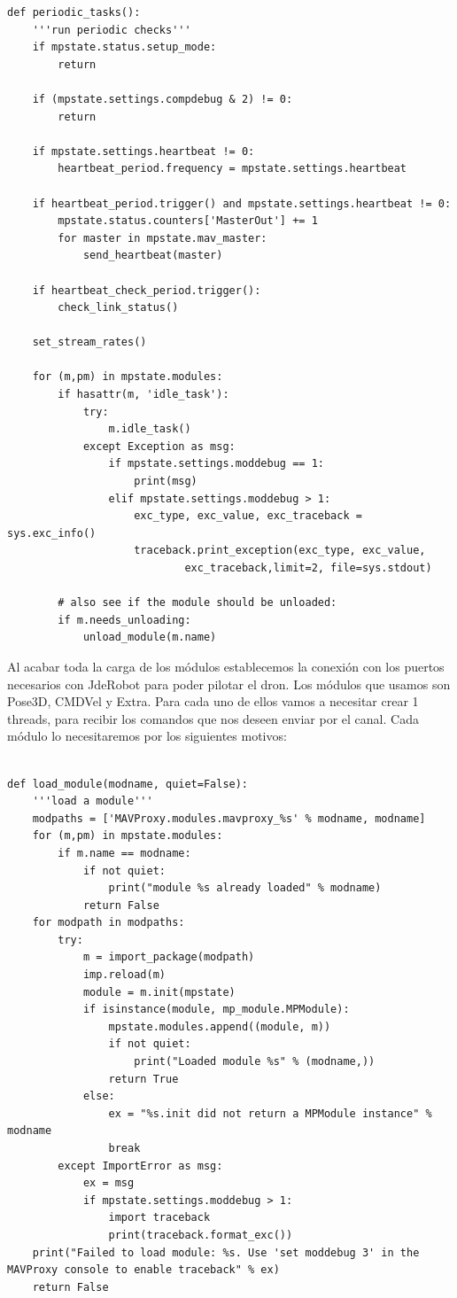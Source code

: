 \begin{lstlisting}[frame=single]
def periodic_tasks():
    '''run periodic checks'''
    if mpstate.status.setup_mode:
        return

    if (mpstate.settings.compdebug & 2) != 0:
        return

    if mpstate.settings.heartbeat != 0:
        heartbeat_period.frequency = mpstate.settings.heartbeat

    if heartbeat_period.trigger() and mpstate.settings.heartbeat != 0:
        mpstate.status.counters['MasterOut'] += 1
        for master in mpstate.mav_master:
            send_heartbeat(master)

    if heartbeat_check_period.trigger():
        check_link_status()

    set_stream_rates()

    for (m,pm) in mpstate.modules:
        if hasattr(m, 'idle_task'):
            try:
                m.idle_task()
            except Exception as msg:
                if mpstate.settings.moddebug == 1:
                    print(msg)
                elif mpstate.settings.moddebug > 1:
                    exc_type, exc_value, exc_traceback = sys.exc_info()
                    traceback.print_exception(exc_type, exc_value, 
                    		exc_traceback,limit=2, file=sys.stdout)

        # also see if the module should be unloaded:
        if m.needs_unloading:
            unload_module(m.name)
\end{lstlisting}
            
Al acabar toda la carga de los módulos establecemos la conexión con los puertos necesarios con JdeRobot para poder pilotar el dron. Los módulos que usamos son Pose3D, CMDVel y Extra. Para cada uno de ellos vamos a necesitar crear 1 threads, para recibir los comandos que nos deseen enviar por el canal. Cada módulo lo necesitaremos por los siguientes motivos:

\begin{lstlisting}[frame=single]

def load_module(modname, quiet=False):
    '''load a module'''
    modpaths = ['MAVProxy.modules.mavproxy_%s' % modname, modname]
    for (m,pm) in mpstate.modules:
        if m.name == modname:
            if not quiet:
                print("module %s already loaded" % modname)
            return False
    for modpath in modpaths:
        try:
            m = import_package(modpath)
            imp.reload(m)
            module = m.init(mpstate)
            if isinstance(module, mp_module.MPModule):
                mpstate.modules.append((module, m))
                if not quiet:
                    print("Loaded module %s" % (modname,))
                return True
            else:
                ex = "%s.init did not return a MPModule instance" % modname
                break
        except ImportError as msg:
            ex = msg
            if mpstate.settings.moddebug > 1:
                import traceback
                print(traceback.format_exc())
    print("Failed to load module: %s. Use 'set moddebug 3' in the MAVProxy console to enable traceback" % ex)
    return False
\end{lstlisting}

